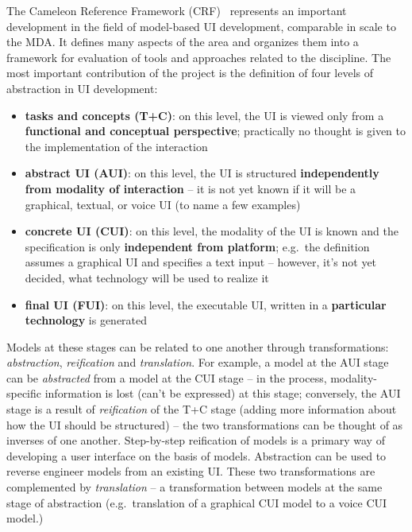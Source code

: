 The Cameleon Reference Framework (CRF)~\cite{calvary_cameleon_framework_2002, calvary_cameleon_glossary_2002} represents an important development in the field of model-based UI development, comparable in scale to the MDA\@.
It defines many aspects of the area and organizes them into a framework for evaluation of tools and approaches related to the discipline.
The most important contribution of the project is the definition of four levels of abstraction in UI development:
\begin{samepage}
\begin{itemize}
    \item \textbf{tasks and concepts (T+C)}: on this level, the UI is viewed only from a \textbf{functional and conceptual perspective};
    practically no thought is given to the implementation of the interaction
    \item \textbf{abstract UI (AUI)}: on this level, the UI is structured \textbf{independently from modality of interaction} -- it is not yet known if it will be a graphical, textual, or voice UI (to name a few examples)
    \item \textbf{concrete UI (CUI)}: on this level, the modality of the UI is known and the specification is only \textbf{independent from platform};
    e.g.\ the definition assumes a graphical UI and specifies a text input -- however, it's not yet decided, what technology will be used to realize it
    \item \textbf{final UI (FUI)}: on this level, the executable UI, written in a \textbf{particular technology} is generated
\end{itemize}
\end{samepage}
Models at these stages can be related to one another through transformations: \emph{abstraction}, \emph{reification} and \emph{translation}.
For example, a model at the AUI stage can be \emph{abstracted} from a model at the CUI stage -- in the process, modality-specific information is lost (can't be expressed) at this stage;
conversely, the AUI stage is a result of \emph{reification} of the T+C stage (adding more information about how the UI should be structured) -- the two transformations can be thought of as inverses of one another.
Step-by-step reification of models is a primary way of developing a user interface on the basis of models.
Abstraction can be used to reverse engineer models from an existing UI\@.
These two transformations are complemented by \emph{translation} -- a transformation between models at the same stage of abstraction (e.g.\ translation of a graphical CUI model to a voice CUI model.)

